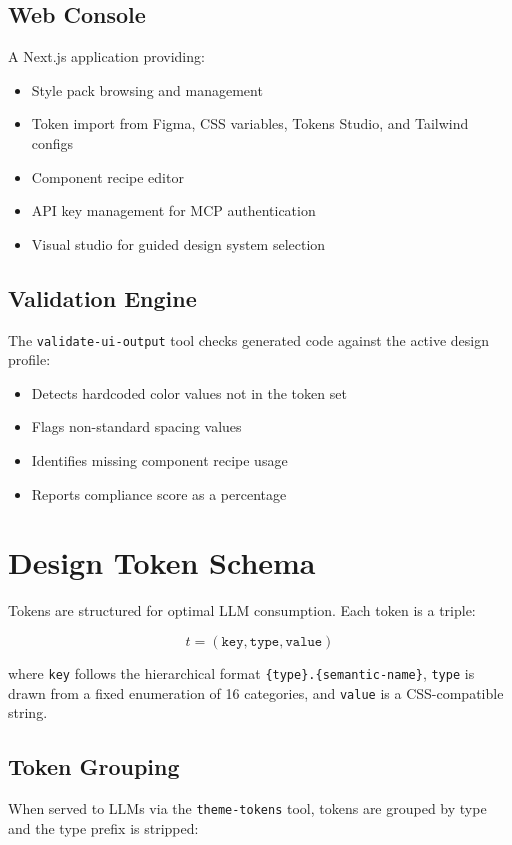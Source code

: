\documentclass[11pt,twocolumn]{article}
\begin{document}
\subsection{Web Console}
A Next.js application providing:
\begin{itemize}[nosep]
  \item Style pack browsing and management
  \item Token import from Figma, CSS variables, Tokens Studio, and Tailwind configs
  \item Component recipe editor
  \item API key management for MCP authentication
  \item Visual studio for guided design system selection
\end{itemize}

\subsection{Validation Engine}
The \texttt{validate-ui-output} tool checks generated code against the active design profile:
\begin{itemize}[nosep]
  \item Detects hardcoded color values not in the token set
  \item Flags non-standard spacing values
  \item Identifies missing component recipe usage
  \item Reports compliance score as a percentage
\end{itemize}

\section{Design Token Schema}

Tokens are structured for optimal LLM consumption. Each token is a triple:

\begin{equation}
  t = (\texttt{key}, \texttt{type}, \texttt{value})
\end{equation}

where \texttt{key} follows the hierarchical format \texttt{\{type\}.\{semantic-name\}}, \texttt{type} is drawn from a fixed enumeration of 16 categories, and \texttt{value} is a CSS-compatible string.

\subsection{Token Grouping}
When served to LLMs via the \texttt{theme-tokens} tool, tokens are grouped by type and the type prefix is stripped:
\end{document}
